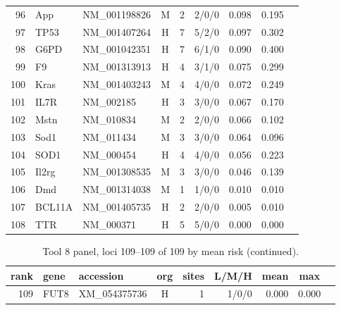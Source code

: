 \begin{table}[h]
\begin{tabular}{rllcrrrcc}
96 & App & NM\_001198826 & M & 2 & 2/0/0 & 0.098 & 0.195 \\
97 & TP53 & NM\_001407264 & H & 7 & 5/2/0 & 0.097 & 0.302 \\
98 & G6PD & NM\_001042351 & H & 7 & 6/1/0 & 0.090 & 0.400 \\
99 & F9 & NM\_001313913 & H & 4 & 3/1/0 & 0.075 & 0.299 \\
100 & Kras & NM\_001403243 & M & 4 & 4/0/0 & 0.072 & 0.249 \\
101 & IL7R & NM\_002185 & H & 3 & 3/0/0 & 0.067 & 0.170 \\
102 & Mstn & NM\_010834 & M & 2 & 2/0/0 & 0.066 & 0.102 \\
103 & Sod1 & NM\_011434 & M & 3 & 3/0/0 & 0.064 & 0.096 \\
104 & SOD1 & NM\_000454 & H & 4 & 4/0/0 & 0.056 & 0.223 \\
105 & Il2rg & NM\_001308535 & M & 3 & 3/0/0 & 0.046 & 0.139 \\
106 & Dmd & NM\_001314038 & M & 1 & 1/0/0 & 0.010 & 0.010 \\
107 & BCL11A & NM\_001405735 & H & 2 & 2/0/0 & 0.005 & 0.010 \\
108 & TTR & NM\_000371 & H & 5 & 5/0/0 & 0.000 & 0.000 \\
\hline
\end{tabular}
\end{table}
\begin{table}[h]
\centering\footnotesize
\caption{Tool 8 panel, loci 109--109 of 109 by mean risk (continued).}
\begin{tabular}{rllcrrrcc}
\hline
rank & gene & accession & org & sites & L/M/H & mean & max \\
\hline
109 & FUT8 & XM\_054375736 & H & 1 & 1/0/0 & 0.000 & 0.000 \\
\hline
\end{tabular}
\end{table}
